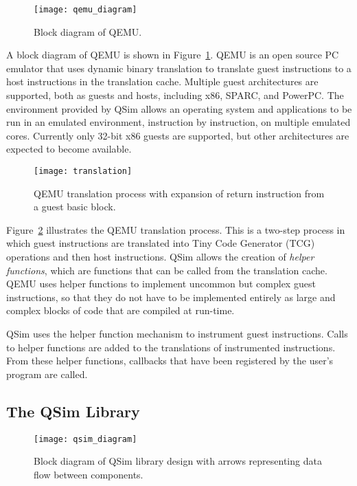 \documentclass[letterpaper, 10pt]{book}
\begin{document}
\begin{figure}
\begin{center}
\texttt{[image: qemu\_diagram]}
\caption{Block diagram of QEMU.}
\label{fig:qemu}
\end{center}
\end{figure}

A block diagram of QEMU is shown in Figure~\ref{fig:qemu}. QEMU is an open
source PC emulator that uses dynamic binary translation to translate guest
instructions to a host instructions in the translation cache. Multiple
guest architectures are supported, both as guests and hosts, including x86,
SPARC, and PowerPC. The environment provided by QSim allows an operating system
and applications to be run in an emulated environment, instruction by
instruction, on multiple emulated cores. Currently only 32-bit x86 guests are
supported, but other architectures are expected to become available.

\begin{figure}
\begin{center}
\texttt{[image: translation]}
\caption{QEMU translation process with expansion of return instruction from a
  guest basic block.}
\label{fig:translation}
\end{center}
\end{figure}

Figure~\ref{fig:translation} illustrates the QEMU translation process. This is a
two-step process in which guest instructions are translated into Tiny Code
Generator (TCG) operations and then host instructions. QSim allows the creation
of \emph{helper functions}, which are functions that can be called from the
translation cache. QEMU uses helper functions to implement uncommon but complex
guest instructions, so that they do not have to be implemented entirely as large
and complex blocks of code that are compiled at run-time.

QSim uses the helper function mechanism to instrument guest instructions. Calls
to helper functions are added to the translations of instrumented instructions.
From these helper functions, callbacks that have been registered by the user's
program are called.

\subsection{The QSim Library}

\begin{figure}
\begin{center}
\texttt{[image: qsim\_diagram]}
\caption{Block diagram of QSim library design with arrows representing data flow
         between components.}
\label{fig:qsim}
\end{center}
\end{figure}
\end{document}
